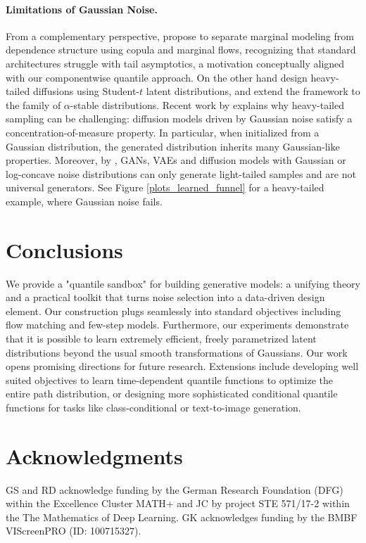 \documentclass{article}
\theoremstyle{plain}
\theoremstyle{definition}
\theoremstyle{remark}
\begin{document}
\paragraph{Limitations of Gaussian Noise.}
From a complementary perspective, \cite{wiese2019copula} propose to 
separate marginal modeling from dependence structure using copula and marginal flows, recognizing that standard architectures struggle with tail asymptotics, a motivation conceptually aligned with our componentwise quantile approach.
On the other hand \cite{pandey2024heavytaileddiffusionmodels,zhang2024longtailed} design
heavy-tailed diffusions using Student-$t$ latent distributions, and \cite{HTDL2025} extend the framework to the family of $\alpha$-stable distributions. \newline
Recent work by \cite{ghane2025concentration} explains why heavy-tailed sampling can be challenging: diffusion models driven by Gaussian noise satisfy a concentration-of-measure property. In particular, when initialized from a Gaussian distribution, the generated distribution inherits many Gaussian-like properties. Moreover, by \cite{tam2025statistical}, 
GANs, VAEs and diffusion models with Gaussian or log-concave noise distributions can only generate light-tailed 
samples and are not universal generators. See Figure \ref{plots_learned_funnel} for a heavy-tailed example, where Gaussian noise fails.

\section{Conclusions} \label{sec:conc}
{ We provide} a "quantile sandbox" for building generative models: a unifying theory and a practical toolkit that turns noise selection into a data-driven design element.
Our construction plugs seamlessly into standard objectives including flow matching and few-step models. Furthermore, our experiments demonstrate that it is possible to learn extremely efficient, freely parametrized latent distributions beyond the usual smooth transformations of Gaussians. Our work opens promising directions for future research. Extensions include developing well suited objectives to learn time-dependent quantile functions to optimize the entire path distribution, or designing more sophisticated conditional quantile functions for tasks like class-conditional or text-to-image generation. 

\section*{Acknowledgments} GS and RD acknowledge funding by the German Research Foundation (DFG)
within the Excellence Cluster MATH+ and JC by project STE 571/17-2 within the The Mathematics
of Deep Learning. GK acknowledges funding by the BMBF VIScreenPRO (ID: 100715327).
\end{document}
